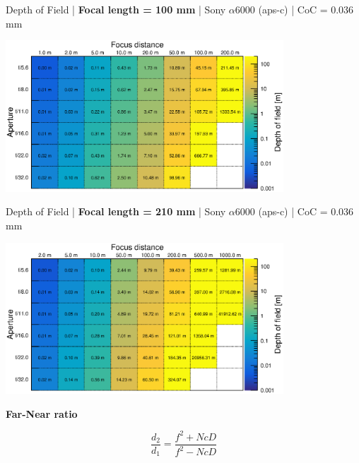 \documentclass[aspectratio=169]{beamer}
\begin{document}
\begin{frame}[plain]{}
  \vspace{1ex}
  \centering
  Depth of Field | {\bf Focal length = 100 mm} |  Sony $\alpha$\hspace{0.1em}6000 (aps-c) | CoC = 0.036 mm
  
  \includegraphics[center,width=0.78\textwidth]{img/depth-of-field_focl100.eps}
\end{frame}

\begin{frame}[plain]{}
  \vspace{1ex}
  \centering
  Depth of Field | {\bf Focal length = 210 mm} |  Sony $\alpha$\hspace{0.1em}6000 (aps-c) | CoC = 0.036 mm
  
  \includegraphics[center,width=0.78\textwidth]{img/depth-of-field_focl210.eps}
\end{frame}


\begin{frame}[plain]{}
  \vspace{3ex}
  \begin{center} \LARGE \bf
    Far-Near ratio
  \end{center}

  {\Large 
    $$\mathit{\frac{d_2}{d_1} = \frac{f^2 + NcD}{f^2 - NcD}}$$
  }

\end{frame}
\end{document}

